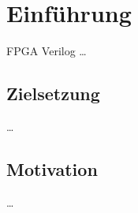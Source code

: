 \chapter{Einführung}

\label{ch:Einfuehrung}
\acrshort{FPGA} \gls{Verilog} \cite{pdf:golson} 
\ldots

\section{Zielsetzung}

\label{ch:Einfuehrung:sec:Zielsetzung}

\ldots

\section{Motivation}

\label{ch:Einfuehrung:sec:Motivation}

\ldots

